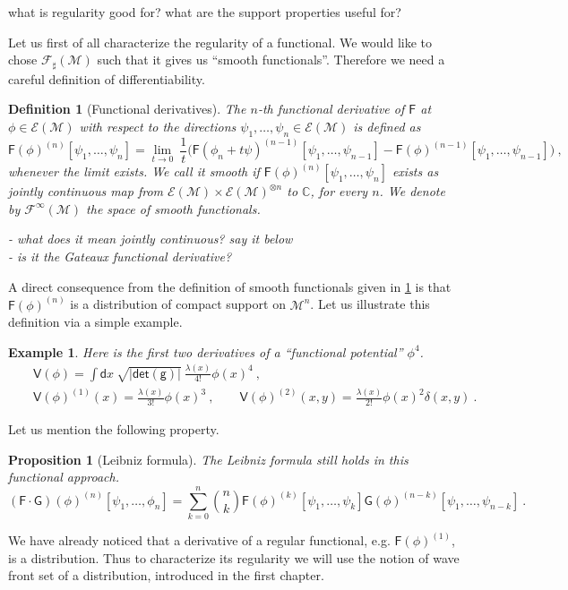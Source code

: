 \documentclass[11pt]{book}
\newcommand{\abs}[1]{\left|#1\right|}
\renewcommand{\det}{\mathsf{det}}
\newcommand{\Ecal}{\mathcal{E}}
\newcommand{\Fcal}{\mathcal{F}}
\newcommand{\Mcal}{\mathcal{M}}
\newcommand{\Cbb}{\mathbb{C}}
\newcommand{\Fsf}{\mathsf{F}}
\newcommand{\Gsf}{\mathsf{G}}
\newcommand{\Vsf}{\mathsf{V}}
\newcommand{\dsf}{\mathsf{d}}
\newcommand{\gsf}{\mathsf{g}}
\theoremstyle{break}
\newtheorem{proposition}{Proposition}
\newtheorem{example}{Example}
\newtheorem{definition}{Definition}
\begin{document}
what is regularity good for?  what are the support properties useful for? 


\bigskip

Let us first of all characterize the regularity of a functional. We would like to chose $\Fcal_\sharp(\Mcal)$ such that it gives us ``smooth functionals''. Therefore we need a careful definition of differentiability.%
%
\begin{definition}[Functional derivatives] \label{def:func-deriv}
The $n$-th functional derivative of $\Fsf$ at $\phi\in\Ecal(\Mcal)$ with respect to the directions $\psi_1, \dots, \psi_n \in\Ecal(\Mcal)$ is defined as%
%
\begin{equation*}%
\Fsf(\phi)^{(n)}[\psi_1,\dots ,\psi_n] = \lim_{t \to 0} \ \frac{1}{t} \bigg( \Fsf(\phi_n + t \psi)^{(n-1)}[\psi_1,\dots ,\psi_{n-1}] - \Fsf(\phi)^{(n-1)}[\psi_1,\dots ,\psi_{n-1}] \bigg) \ ,
\end{equation*}
%
whenever the limit exists. We call it smooth if $\Fsf(\phi)^{(n)}[\psi_1,\dots ,\psi_n]$ exists as jointly continuous map from $\Ecal(\Mcal) \times \Ecal(\Mcal)^{\otimes n}$ to $\Cbb$, for every $n$. We denote by $\Fcal^\infty(\Mcal)$ the space of smooth functionals.

- what does it mean jointly continuous? say it below \\
- is it the Gateaux functional derivative?

\end{definition}
%
A direct consequence from the definition of smooth functionals given in \ref{def:func-deriv} is that $\Fsf(\phi)^{(n)}$ is a distribution of compact support on $\Mcal^n$.  Let us illustrate this definition via a simple example.%
\begin{example}
%
Here is the first two derivatives of a ``functional potential'' $\phi^4$. 
%
\begin{eqnarray*}
&& \Vsf(\phi) = \int \dsf x \ \sqrt{\abs{\det(\gsf)}} \ \frac{\lambda(x)}{4!} \phi(x)^4 \ ,\\
%
&& \Vsf(\phi)^{(1)}(x) = \frac{\lambda(x)}{3!} \phi(x)^3 \ , \qquad
%
\Vsf(\phi)^{(2)}(x,y) = \frac{\lambda(x)}{2!} \phi(x)^2 \delta(x,y) \ .
\end{eqnarray*}
%
\end{example}
%
Let us mention the following property.
%
\begin{proposition}[Leibniz formula]
The Leibniz formula still holds in this functional approach.
%
\begin{equation*}
\left(\Fsf \cdot \Gsf\right)(\phi)^{(n)}[\psi_1, \dots ,\phi_n] = \sum_{k=0}^{n} \binom{n}{k} \Fsf(\phi)^{(k)}[\psi_1, \dots , \psi_k] \Gsf(\phi)^{(n-k)}[\psi_1, \dots , \psi_{n-k}] \ .
\end{equation*}
%
\end{proposition}
%
%
We have already noticed that a derivative of a regular functional, e.g. $\Fsf(\phi)^{(1)}$, is a distribution. Thus to characterize its regularity we will use the notion of wave front set of a distribution, introduced in the first chapter.%
\end{document}
